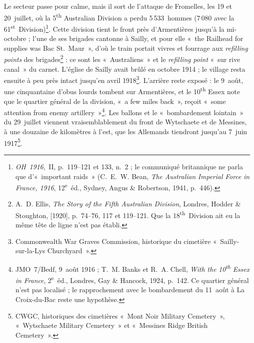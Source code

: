 Le secteur passe pour calme, mais il sort de l'attaque de Fromelles, les 19 et 20~juillet, où la 5\textsuperscript{th} Australian Division a perdu 5\,533~hommes (7\,080 avec la 61\textsuperscript{st}~Division)\footnote{\textit{OH~1916},~II, p.~119--121 et 133, n.~2 ; le communiqué britannique ne parla que d'«~important raids~» (C.~E.~W. Bean, \textit{The Australian Imperial Force in France, 1916}, 12\textsuperscript{e}~éd., Sydney, Angus \& Robertson, 1941, p.~446).}. Cette division tient le front près d'Armentières jusqu'à la mi-octobre ; l'une de ses brigades cantonne à Sailly, et pour elle «~the Railhead for supplies was Bac St.~Maur~», d'où le train portait vivres et fourrage aux \textit{refilling points} des brigades\footnote{A.~D. Ellis, \textit{The Story of the Fifth Australian Division}, Londres, Hodder \& Stoughton, [1920], p.~74--76, 117 et 119--121. Que la 18\textsuperscript{th}~Division ait eu la même tête de ligne n'est pas établi.} : ce sont les «~Australiens~» et le \textit{refilling point} «~sur rive canal~» du carnet. L'église de Sailly avait brûlé en octobre 1914 ; le village resta ensuite à peu près intact jusqu'en avril 1918\footnote{Commonwealth War Graves Commission, historique du cimetière «~Sailly-sur-la-Lys Churchyard~».}. L'arrière reste exposé : le 9~août, une cinquantaine d'obus lourds tombent sur Armentières, et le 10\textsuperscript{th} Essex note que le quartier général de la division, «~a few miles back~», reçoit «~some attention from enemy artillery~»\footnote{JMO~7/Bedf, 9~août 1916 ; T.~M. Banks et R.~A. Chell, \textit{With the 10\textsuperscript{th} Essex in France}, 2\textsuperscript{e}~éd., Londres, Gay \& Hancock, 1924, p.~142. Ce quartier général n'est pas localisé ; le rapprochement avec le bombardement du 11~août à La Croix-du-Bac reste une hypothèse.}. Les ballons et le «~bombardement lointain~» du 29~juillet viennent vraisemblablement du front de Wytschaete et de Messines, à une douzaine de kilomètres à l'est, que les Allemands tiendront jusqu'au 7~juin 1917\footnote{CWGC, historiques des cimetières «~Mont Noir Military Cemetery~», «~Wytschaete Military Cemetery~» et «~Messines Ridge British Cemetery~».}.

